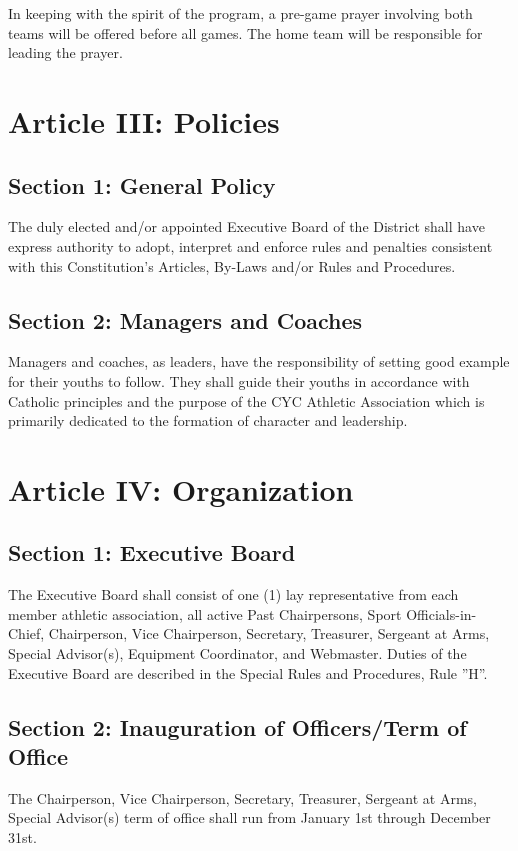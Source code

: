 \documentclass[draft]{memoir}
\begin{document}
In keeping with the spirit of the program, a pre-game prayer involving both teams will be offered before all games. The home team will be responsible for leading the prayer.

\section[Article III: Policies]{Article III: Policies}
\subsection{Section 1: General Policy}
The duly elected and/or appointed Executive Board of the District shall have express authority to adopt, interpret and enforce rules and penalties consistent with this Constitution’s Articles, By-Laws and/or Rules and Procedures.

\subsection{Section 2: Managers and Coaches}
Managers and coaches, as leaders, have the responsibility of setting good example for their youths to follow.  They  shall guide their youths in accordance with Catholic principles and the purpose of the CYC Athletic Association  which is primarily dedicated to the formation of character and leadership.

\section{Article IV: Organization}
\subsection{Section 1: Executive Board}
The Executive Board shall consist of one (1) lay representative from each member athletic association, all active Past Chairpersons, Sport Officials-in-Chief, Chairperson, Vice Chairperson, Secretary, Treasurer, Sergeant at Arms, Special Advisor(s), Equipment Coordinator, and Webmaster.  Duties of the Executive Board are described in the Special Rules and Procedures, Rule ”H”.

\subsection{Section 2: Inauguration of Officers/Term of Office}
The Chairperson, Vice Chairperson, Secretary, Treasurer, Sergeant at Arms, Special Advisor(s) term of office shall run from January 1st through December 31st.  
\end{document}
